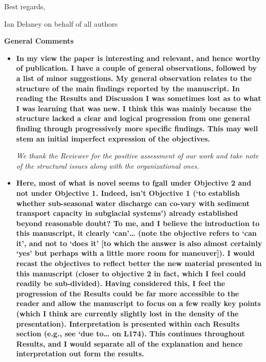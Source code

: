 \documentclass[11pt]{article}
\title{}
\author{}
\begin{document}
\vspace{.1cm}

Best regards,

\vspace{.1cm}

Ian Delaney on behalf of all authors

\textbf{General Comments}

\begin{itemize}

\item \textbf{In my view the paper is interesting and relevant, and hence worthy of publication. I have a couple
    of general observations, followed by a list of minor suggestions.
    My general observation relates to the structure of the main findings reported by the manuscript.
    In reading the Results and Discussion I was sometimes lost as to what I was learning that was new.
    I think this was mainly because the structure lacked a clear and logical progression from one
    general finding through progressively more specific findings. This may well stem an initial
    imperfect expression of the objectives.}

  \textit{We thank the Reviewer for the positive assessment of our work and take note of the structural issues along with the organizational ones. }
  
\item  \textbf{Here, most of what is novel seems to fgall under Objective
    2 and not under Objective 1. Indeed, isn’t Objective 1 (‘to establish whether sub-seasonal water
    discharge can co-vary with sediment transport capacity in subglacial systems’) already established
    beyond reasonable doubt? To me, and I believe the introduction to this manuscript, it clearly
    ‘can’… (note the objective refers to ‘can it’, and not to ‘does it’ [to which the answer is also almost
    certainly ‘yes’ but perhaps with a little more room for maneuver]). I would recast the objectives
    to reflect better the new material presented in this manuscript (closer to objective 2 in fact, which
    I feel could readily be sub-divided). Having considered this, I feel the progression of the Results
    could be far more accessible to the reader and allow the manuscript to focus on a few really key
    points (which I think are currently slightly lost in the density of the presentation).
    Interpretation is presented within each Results section (e.g., see ‘due to… on L174). This
    continues throughout Results, and I would separate all of the explanation and hence
    interpretation out form the results.}


\end{itemize}
\end{document}
